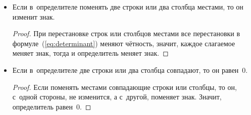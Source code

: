 \begin{itemize}
\begin{proof}
\begin{equation*}
	= \sum (-1)^{|\sigma|} a_{1\, i_1} \cdot \ldots \cdot a_{k-1\, i_{k-1}} (a_{k\, i_k} + b_{k\, i_k}) a_{k+1\, i_{k+1}} \cdot \ldots \cdot a_{n\, i_n} =
	\end{equation*}
	\begin{equation*}
	= \sum (-1)^{|\sigma|} a_{1\, i_1} \cdot \ldots \cdot a_{k\, i_k} \cdot \ldots \cdot a_{n\, i_n} +
	\sum (-1)^{|\sigma|} a_{1\, i_1} \cdot \ldots \cdot b_{k\, i_k} \cdot \ldots \cdot a_{n\, i_n} =
	\end{equation*}
	\begin{equation*}
	= \begin{vmatrix}
	a_{11} & a_{12} & \cdots & a_{1n} \\
	\vdots & \vdots & \ddots & \vdots \\
	a_{i1} & a_{i2} & \cdots & a_{in} \\
	\vdots & \vdots & \ddots & \vdots \\
	a_{n1} & a_{n2} & \cdots & a_{nn}
	\end{vmatrix} +
	\begin{vmatrix}
	a_{11} & a_{12} & \cdots & a_{1n} \\
	\vdots & \vdots & \ddots & \vdots \\
	b_{i1} & b_{i2} & \cdots & b_{in} \\
	\vdots & \vdots & \ddots & \vdots \\
	a_{n1} & a_{n2} & \cdots & a_{nn}
	\end{vmatrix}
	\end{equation*}
	Свойство для столбцов доказывается аналогично.
	\end{proof}
	
	\item Если в~определителе поменять две строки или два столбца местами, то он изменит знак.
	\begin{proof}
	При перестановке строк или столбцов местами все перестановки в формуле~(\ref{eq:determinant}) меняют чётность, значит, каждое слагаемое меняет знак, тогда и определитель меняет знак.
	\end{proof}
	
	\item Если в~определителе две строки или два столбца совпадают, то он равен~$0$.
	\begin{proof}
	Если поменять местами совпадающие строки или столбцы, то он, с~одной стороны, не изменится, а с~другой, поменяет знак. Значит, определитель равен~$0$.
	\end{proof}
	

\end{itemize}
